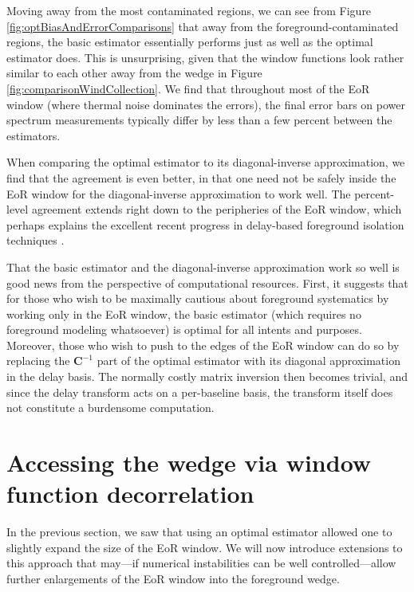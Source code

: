 \documentclass[twocolumn,aps,prd,nofootinbib,showpacs]{revtex4-1}
\begin{document}
Moving away from the most contaminated regions, we can see from Figure \ref{fig:optBiasAndErrorComparisons} that away from the foreground-contaminated regions, the basic estimator essentially performs just as well as the optimal estimator does.  This is unsurprising, given that the window functions look rather similar to each other away from the wedge in Figure \ref{fig:comparisonWindCollection}.  We find that throughout most of the EoR window (where thermal noise dominates the errors), the final error bars on power spectrum measurements typically differ by less than a few percent between the estimators.

When comparing the optimal estimator to its diagonal-inverse approximation, we find that the agreement is even better, in that one need not be safely inside the EoR window for the diagonal-inverse approximation to work well.  The percent-level agreement extends right down to the peripheries of the EoR window, which perhaps explains the excellent recent progress in delay-based foreground isolation techniques \cite{Parsons2013}.

That the basic estimator and the diagonal-inverse approximation work so well is good news from the perspective of computational resources.  First, it suggests that for those who wish to be maximally cautious about foreground systematics by working only in the EoR window, the basic estimator (which requires no foreground modeling whatsoever) is optimal for all intents and purposes.  Moreover, those who wish to push to the edges of the EoR window can do so by replacing the $\mathbf{C}^{-1}$ part of the optimal estimator with its diagonal approximation in the delay basis.  The normally costly matrix inversion then becomes trivial, and since the delay transform acts on a per-baseline basis, the transform itself does not constitute a burdensome computation.

\section{Accessing the wedge via window function decorrelation}
\label{sec:Decorr}
In the previous section, we saw that using an optimal estimator allowed one to slightly expand the size of the EoR window.  We will now introduce extensions to this approach that may---if numerical instabilities can be well controlled---allow further enlargements of the EoR window into the foreground wedge.
\end{document}
